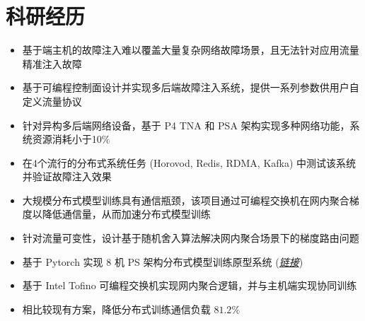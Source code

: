 \documentclass{resume}
\begin{document}

\section{科研经历}

\begin{itemize}[parsep=0.5ex]
  \item 基于端主机的故障注入难以覆盖大量复杂网络故障场景，且无法针对应用流量精准注入故障
  \item 基于可编程控制面设计并实现多后端故障注入系统，提供一系列参数供用户自定义流量协议
  \item 针对异构多后端网络设备，基于 P4 TNA 和 PSA 架构实现多种网络功能，系统资源消耗小于10\%
  \item 在4个流行的分布式系统任务 (Horovod, Redis, RDMA, Kafka) 中测试该系统并验证故障注入效果
\end{itemize}

\begin{itemize}[parsep=0.5ex]
  \item 大规模分布式模型训练具有通信瓶颈，该项目通过可编程交换机在网内聚合梯度以降低通信量，从而加速分布式模型训练
  \item 针对流量可变性，设计基于随机舍入算法解决网内聚合场景下的梯度路由问题
  \item 基于 Pytorch 实现 8 机 PS 架构分布式模型训练原型系统 (\href{https://github.com/Fangjin98/distributed-training-INA/}{\textit{链接}})
  \item 基于 Intel Tofino 可编程交换机实现网内聚合逻辑，并与主机端实现协同训练
  \item 相比较现有方案，降低分布式训练通信负载 $81.2\%$
\end{itemize}
\end{document}
